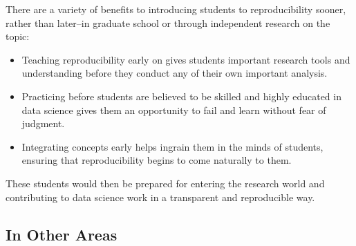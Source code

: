 \documentclass[12pt,twoside]{reedthesis}
\begin{document}
There are a variety of benefits to introducing students to reproducibility sooner, rather than later--in graduate school or through independent research on the topic:
\begin{itemize}
\item
  Teaching reproducibility early on gives students important research tools and understanding before they conduct any of their own important analysis.
\item
  Practicing before students are believed to be skilled and highly educated in data science gives them an opportunity to fail and learn without fear of judgment.
\item
  Integrating concepts early helps ingrain them in the minds of students, ensuring that reproducibility begins to come naturally to them.
\end{itemize}
These students would then be prepared for entering the research world and contributing to data science work in a transparent and reproducible way.

\hypertarget{in-other-areas}{%
\subsection{In Other Areas}\label{in-other-areas}}
\end{document}
